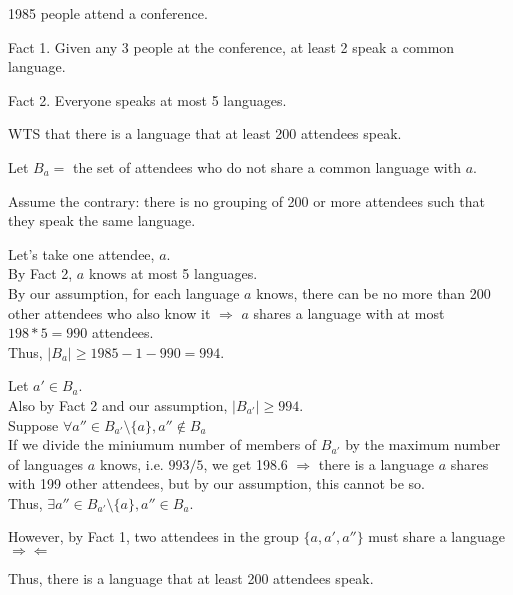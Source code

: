 \documentclass[fleqn]{article}
\begin{document}
1985 people attend a conference.

Fact 1. Given any 3 people at the conference, 
at least 2 speak a common language.

Fact 2. Everyone speaks at most 5 languages.

WTS that there is a language that at least 200 attendees speak.

Let $B_a = $ the set of attendees who do not share a common language with $a$.

Assume the contrary: there is no grouping of 200 or more attendees such that they speak the same language.

Let's take one attendee, $a$.\\
By Fact 2, $a$ knows at most 5 languages.\\
By our assumption, for each language $a$ knows, there can be no more than 200 other attendees who also know it $\Rightarrow$ $a$ shares a language with at most $198*5=990$ attendees.\\
Thus, $|B_a| \geq 1985-1-990=994$.

Let $a' \in B_a$.\\
Also by Fact 2 and our assumption, $|B_{a'}| \geq 994$.\\
Suppose $\forall a'' \in B_{a'}\setminus \lbrace a \rbrace, 
          a'' \not\in B_a$\\
If we divide the miniumum number of members of $B_{a'}$ by the maximum
number of languages $a$ knows, i.e. $993/5$, we get 198.6 $\Rightarrow$ there is a language $a$ shares with 199 other attendees, but by our assumption, this cannot be so.\\
Thus, $\exists a'' \in B_{a'}\setminus \lbrace a \rbrace,
        a'' \in B_a$.

However, by Fact 1, two attendees in the group 
$\lbrace a, a', a'' \rbrace$ must share a language 
$\Rightarrow \Leftarrow$

Thus, there is a language that at least 200 attendees speak.
\end{document}
